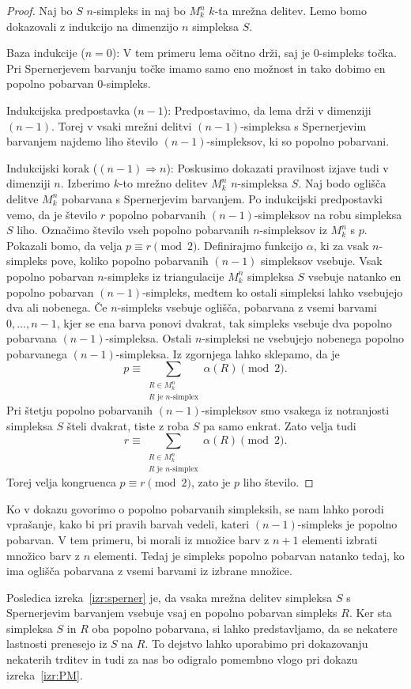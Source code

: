 \documentclass[mat1]{fmfdelo}
\newcommand{\0}{0}
\begin{document}
\begin{proof}
Naj bo $S$ $n$-simpleks in naj bo $M_k^n$ $k$-ta mrežna delitev. Lemo bomo dokazovali z indukcijo na dimenzijo $n$ simpleksa $S$.

Baza indukcije ($n = 0$):
V tem primeru lema očitno drži, saj je $0$-simpleks točka. Pri Spernerjevem barvanju točke imamo samo eno možnost in tako dobimo en popolno pobarvan $0$-simpleks.

Indukcijska predpostavka ($n - 1$):
Predpostavimo, da lema drži v dimenziji $(n - 1)$. Torej v vsaki mrežni delitvi $(n - 1)$-simpleksa s Spernerjevim barvanjem najdemo liho število $(n - 1)$-simpleksov, ki so popolno pobarvani.

Indukcijski korak ($(n - 1) \Longrightarrow n$):
Poskusimo dokazati pravilnost izjave tudi v dimenziji $n$. Izberimo $k$-to mrežno delitev $M_k^n$ $n$-simpleksa $S$. Naj bodo oglišča delitve $M_k^n$ pobarvana s Spernerjevim barvanjem. Po indukcijski predpostavki vemo, da je število $r$ popolno pobarvanih $(n-1)$-simpleksov na robu simpleksa $S$ liho. Označimo število vseh popolno pobarvanih $n$-simpleksov iz $M_k^n$ s $p$. Pokazali bomo, da velja $p \equiv r \pmod 2$.
Definirajmo funkcijo $\alpha$, ki za vsak $n$-simpleks pove, koliko popolno pobarvanih $(n-1)$ simpleksov vsebuje. Vsak popolno pobarvan $n$-simpleks iz triangulacije $M_k^n$ simpleksa $S$ vsebuje natanko en popolno pobarvan $(n-1)$-simpleks, medtem ko ostali simpleksi lahko vsebujejo dva ali nobenega. Če $n$-simpleks vsebuje oglišča, pobarvana z vsemi barvami $0, \dots, n-1$, kjer se ena barva ponovi dvakrat, tak simpleks vsebuje dva popolno pobarvana $(n-1)$-simpleksa. Ostali $n$-simpleksi ne vsebujejo nobenega popolno pobarvanega $(n - 1)$-simpleksa. Iz zgornjega lahko sklepamo, da je 
$$p \equiv 
\sum\limits_{\substack{
R \in M_k^n
 \\ 
R\text{ je } n\text{-simplex}
 }} 
 \alpha(R) \pmod 2.$$
Pri štetju popolno pobarvanih $(n - 1)$-simpleksov smo vsakega iz notranjosti simpleksa $S$ šteli dvakrat, tiste z roba $S$ pa samo enkrat. Zato velja tudi 
$$r \equiv 
\sum\limits_{\substack{
R \in M_k^n
 \\ 
R\text{ je } n\text{-simplex}
 }}
  \alpha(R) \pmod 2.$$ 
Torej velja kongruenca $p \equiv r \pmod 2$, zato je $p$ liho število.
\end{proof}
\begin{opomba}
Ko v dokazu govorimo o popolno pobarvanih simpleksih, se nam lahko porodi vprašanje, kako bi pri pravih barvah vedeli, kateri $(n-1)$-simpleks je popolno pobarvan. V tem primeru, bi morali iz množice barv z $n+1$ elementi izbrati množico barv z $n$ elementi. Tedaj je simpleks popolno pobarvan natanko tedaj, ko ima oglišča pobarvana z vsemi barvami iz izbrane množice.
\end{opomba}
Posledica izreka~\ref{izr:sperner} je, da vsaka mrežna delitev simpleksa $S$ s Spernerjevim barvanjem vsebuje vsaj en popolno pobarvan simpleks $R$. Ker sta simpleksa $S$ in $R$ oba popolno pobarvana, si lahko predstavljamo, da se nekatere lastnosti prenesejo iz $S$ na $R$. To dejstvo lahko uporabimo pri dokazovanju nekaterih trditev in tudi za nas bo odigralo pomembno vlogo pri dokazu izreka~\ref{izr:PM}. 
\end{document}
